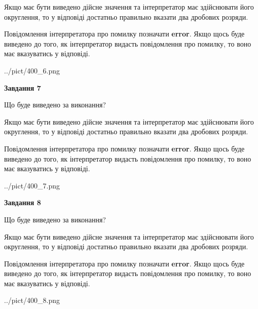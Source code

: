 \documentclass[12pt, ukrainian]{article}
\begin{document}
{\begin {Large}
Якщо має бути виведено дійсне значення та інтерпретатор має здійснювати його округлення, 
то у відповіді достатньо правильно вказати два дробових розряди.

Повідомлення інтерпретатора про помилку позначати \textbf{error}.
Якщо щось буде виведено до того, як інтерпретатор видасть повідомлення про помилку, 
то воно має вказуватись у відповіді. \par

\begin{center}
	{../pict/400_6.png}
\end{center}
\newpage

{\begin {center}\textbf{Завдання 7}\end {center}}\par
Що буде виведено за виконання? \par

Якщо має бути виведено дійсне значення та інтерпретатор має здійснювати його округлення, 
то у відповіді достатньо правильно вказати два дробових розряди.

Повідомлення інтерпретатора про помилку позначати \textbf{error}.
Якщо щось буде виведено до того, як інтерпретатор видасть повідомлення про помилку, 
то воно має вказуватись у відповіді. \par

\begin{center}
	{../pict/400_7.png}
\end{center}
\newpage

{\begin {center}\textbf{Завдання 8}\end {center}}\par
Що буде виведено за виконання? \par

Якщо має бути виведено дійсне значення та інтерпретатор має здійснювати його округлення, 
то у відповіді достатньо правильно вказати два дробових розряди.

Повідомлення інтерпретатора про помилку позначати \textbf{error}.
Якщо щось буде виведено до того, як інтерпретатор видасть повідомлення про помилку, 
то воно має вказуватись у відповіді. \par

\begin{center}
	{../pict/400_8.png}
\end{center}
\newpage


\end{Large}}
\end{document}

